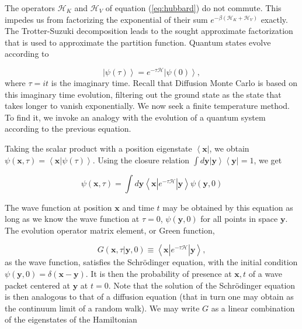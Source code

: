 \documentclass[10pt, twocolumn, twoside]{article}
\begin{document}
The operators $\mathcal{H}_K$ and $\mathcal{H}_V$ of equation (\ref{eq:hubbard}) do not commute. This impedes us from factorizing the exponential of their sum $e^{-\beta (\mathcal{H}_K + \mathcal{H}_V)}$ exactly. The Trotter-Suzuki decomposition leads to the sought approximate factorization that is used to approximate the partition function. Quantum states evolve according to

\begin{equation}
\left| \psi (\tau) \right\rangle = e^{-\tau \mathcal{H} } \left| \psi (0) \right\rangle ,
\end{equation}
where $\tau = it$ is the imaginary time. Recall that Diffusion Monte Carlo is based on this imaginary time evolution, filtering out the ground state as the state that takes longer to vanish exponentially. We now seek a finite temperature method. To find it, we invoke an analogy with the evolution of a quantum system according to the previous equation.

Taking the scalar product with a position eigenstate $ \left\langle \bm x \right|$, we obtain $\psi (\bm x, \tau) = \left\langle \bm x | \psi (\tau) \right\rangle$. Using the closure relation $\int d\bm y \left| \bm y \right\rangle  \left\langle \bm y \right| = 1$, we get

\begin{equation}
\psi ( \bm x , \tau ) = \int d\bm y \left\langle \bm x | e^{-\tau \mathcal{H}} | \bm y \right\rangle \psi (\bm y, 0)
\end{equation}

The wave function at position $\bm x$ and time $t$ may be obtained by this equation as long as we know the wave function at $\tau = 0$, $\psi (\bm y, 0)$ for all points in space $\bm y$. The evolution operator matrix element, or Green function, 

\begin{equation}
G ( \bm x, \tau | \bm y, 0 ) \equiv \left\langle \bm x | e^{-\tau \mathcal{H}} | \bm y \right\rangle ,
\end{equation}
as the wave function, satisfies the Schr\"odinger equation, with the initial condition $\psi (\bm y, 0) = \delta (\bm x - \bm y )$. It is then the probability of presence at $\bm x, t$ of a wave packet centered at $\bm y$ at $t = 0$. Note that the solution of the Schr\"odinger equation is then analogous to that of a diffusion equation (that in turn one may obtain as the continuum limit of a random walk). We may write $G$ as a linear combination of the eigenstates of the Hamiltonian
\end{document}
